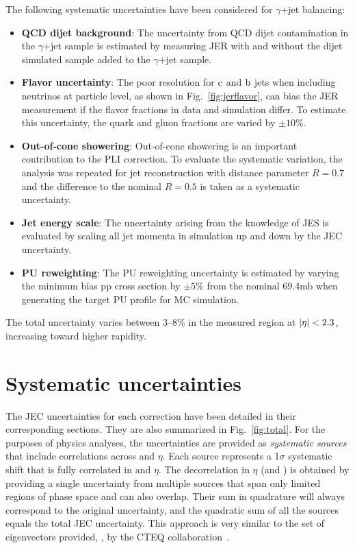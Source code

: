 \documentclass[11pt,twoside,a4paper,cmspaper,final,collab]{cms-tdr}
\begin{document}
The following systematic uncertainties have been considered for $\gamma$+jet balancing:
\begin{itemize}
\item \textbf{QCD dijet background}: The uncertainty from QCD dijet contamination in the $\gamma$+jet sample is estimated by measuring JER with and without the dijet simulated sample added to the $\gamma$+jet sample.
\item \textbf{Flavor uncertainty}: The poor resolution for $\mathrm{c}$ and $\mathrm{b}$ jets when including neutrinos at particle level, as shown in Fig.~\ref{fig:jerflavor}, can bias the JER measurement if the flavor fractions in data and simulation differ. To estimate this uncertainty, the quark and gluon fractions are varied by $\pm 10$\%.
\item \textbf{Out-of-cone showering}: Out-of-cone showering is an important contribution to the PLI correction. To evaluate the systematic variation, the analysis was repeated for jet reconstruction with distance parameter $R=0.7$ and the difference to the nominal $R=0.5$ is taken as a systematic uncertainty.
\item \textbf{Jet energy scale}: The uncertainty arising from the knowledge of JES is evaluated by scaling all jet momenta in simulation up and down by the JEC uncertainty.
\item \textbf{PU reweighting}: The PU reweighting uncertainty is estimated by varying the minimum bias pp cross section by $\pm 5$\% from the nominal 69.4\unit{mb} when generating the target PU profile for MC simulation.
\end{itemize}
The total uncertainty varies between 3--8\% in the measured region at $\lvert \eta \rvert<2.3$, increasing toward higher rapidity.

\section{Systematic uncertainties}
\label{Sec:uncert}

The JEC uncertainties for each correction have been detailed in their corresponding sections. They are also summarized in Fig.~\ref{fig:total}. For the purposes of physics analyses, the uncertainties are provided as \textit{systematic sources} that include correlations across \pt and $\eta$. Each source represents a 1$\sigma$ systematic shift that is fully correlated in \pt and $\eta$. The decorrelation in $\eta$ (and \pt) is obtained by providing a single uncertainty from multiple sources that span only limited regions of phase space and can also overlap. Their sum in quadrature will always correspond to the original uncertainty, and the quadratic sum of all the sources equals the total JEC uncertainty.
This approach is very similar to the set of eigenvectors provided, \eg, by the CTEQ collaboration~\cite{cteq}.
\end{document}
